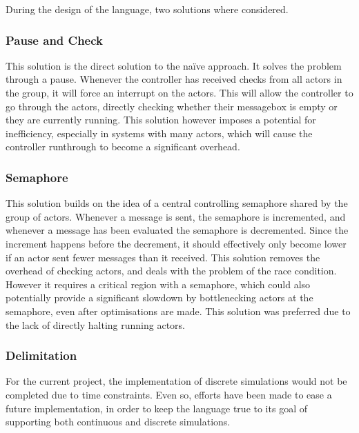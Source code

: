 During the design of the language, two solutions where considered.

\subsubsection{Pause and Check}

This solution is the direct solution to the naïve approach. It solves the problem through a pause. Whenever the controller has received checks from all actors in the group, it will force an interrupt on the actors. This will allow the controller to go through the actors, directly checking whether their messagebox is empty or they are currently running. This solution however imposes a potential for inefficiency, especially in systems with many actors, which will cause the controller runthrough to become a significant overhead.

\subsubsection{Semaphore}

This solution builds on the idea of a central controlling semaphore shared by the group of actors. Whenever a message is sent, the semaphore is incremented, and whenever a message has been evaluated the semaphore is decremented. Since the increment happens before the decrement, it should effectively only become lower if an actor sent fewer messages than it received. This solution removes the overhead of checking actors, and deals with the problem of the race condition. However it requires a critical region with a semaphore, which could also potentially provide a significant slowdown by bottlenecking actors at the semaphore, even after optimisations are made. This solution was preferred due to the lack of directly halting running actors.

\subsubsection{Delimitation}

For the current project, the implementation of discrete simulations would not be completed due to time constraints. Even so, efforts have been made to ease a future implementation, in order to keep the language true to its goal of supporting both continuous and discrete simulations.
